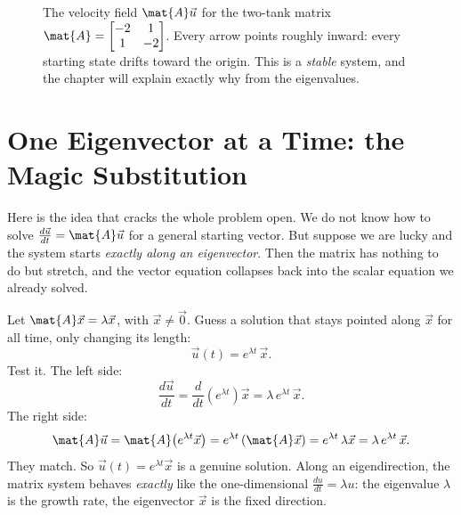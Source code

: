 \begin{figure}[H]
\centering
{}
\caption{The velocity field $\mat{A}\vec{u}$ for the two-tank matrix
$\mat{A}=\protect\begin{bmatrix}-2&1\\1&-2\protect\end{bmatrix}$. Every arrow
points roughly inward: every starting state drifts toward the origin. This is a
\emph{stable} system, and the chapter will explain exactly why from the
eigenvalues.}
\label{ch25:fig-field}
\end{figure}

\section{One Eigenvector at a Time: the Magic Substitution}
\label{ch25:onemode}

Here is the idea that cracks the whole problem open. We do not know how to solve
$\frac{d\vec{u}}{dt} = \mat{A}\vec{u}$ for a general starting vector. But suppose
we are lucky and the system starts \emph{exactly along an eigenvector}. Then the
matrix has nothing to do but stretch, and the vector equation collapses back into
the scalar equation we already solved.

Let $\mat{A}\vec{x} = \lambda\vec{x}$, with $\vec{x}\neq\vec{0}$. Guess a solution
that stays pointed along $\vec{x}$ for all time, only changing its length:
\[
  \vec{u}(t) = e^{\lambda t}\,\vec{x}.
\]
Test it. The left side:
\[
  \frac{d\vec{u}}{dt} = \frac{d}{dt}\!\left(e^{\lambda t}\right)\vec{x}
  = \lambda\, e^{\lambda t}\,\vec{x}.
\]
The right side:
\[
  \mat{A}\vec{u} = \mat{A}\!\left(e^{\lambda t}\vec{x}\right)
  = e^{\lambda t}\,(\mat{A}\vec{x})
  = e^{\lambda t}\,\lambda\vec{x}
  = \lambda\,e^{\lambda t}\,\vec{x}.
\]
They match. So $\vec{u}(t) = e^{\lambda t}\vec{x}$ is a genuine solution. Along an
eigendirection, the matrix system behaves \emph{exactly} like the one-dimensional
$\frac{du}{dt} = \lambda u$: the eigenvalue $\lambda$ is the growth rate, the
eigenvector $\vec{x}$ is the fixed direction.

